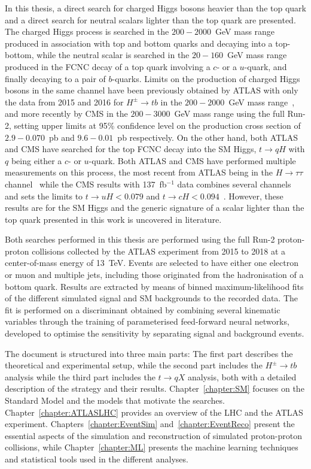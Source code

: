 In this thesis, a direct search for charged Higgs bosons heavier than the top quark and a direct search for neutral scalars lighter than the top quark are presented. The charged Higgs process is searched in the $200-2000$~GeV mass range produced in association with top and bottom quarks and decaying into a top-bottom, while the neutral scalar is searched in the $20-160$~GeV mass range produced in the FCNC decay of a top quark involving a $c$- or a $u$-quark, and finally decaying to a pair of $b$-quarks. Limits on the production of charged Higgs bosons in the same channel have been previously obtained by ATLAS with only the data from 2015 and 2016 for $H^\pm\to tb$ in the $200-2000$~GeV mass range~\cite{ATLASHptb2018}, and more recently by CMS in the $200-3000$~GeV mass range using the full Run-2, setting upper limits at 95\% confidence level on the production cross section of $2.9-0.070$~pb and $9.6-0.01$~pb respectively. On the other hand, both ATLAS and CMS have searched for the top FCNC decay into the SM Higgs, $t\to qH$ with $q$ being either a $c$- or $u$-quark. Both ATLAS and CMS have performed multiple measurements on this process, the most recent from ATLAS being in the $H\to\tau\tau$ channel~\cite{ATLAStqHtautau} while the CMS results with 137~fb$^{-1}$ data combines several channels and sets the limits to $t\to uH < 0.079$ and $t\to cH < 0.094$~\cite{CMStqHRun2}. However, these results are for the SM Higgs and the generic signature of a scalar lighter than the top quark presented in this work is uncovered in literature.

Both searches performed in this thesis are performed using the full Run-2 proton-proton collisions collected by the ATLAS experiment from 2015 to 2018 at a center-of-mass energy of 13~TeV. Events are selected to have either one electron or muon and multiple jets, including those originated from the hadronisation of a bottom quark. Results are extracted by means of binned maximum-likelihood fits of the different simulated signal and SM backgrounds to the recorded data. The fit is performed on a discriminant obtained by combining several kinematic variables through the training of parameterised feed-forward neural networks, developed to optimise the sensitivity by separating signal and background events.

The document is structured into three main parts: The first part describes the theoretical and experimental setup, while the second part includes the $H^\pm\to tb$ analysis while the third part includes the $t\to qX$ analysis, both with a detailed description of the strategy and their results. Chapter~\ref{chapter:SM} focuses on the Standard Model and the models that motivate the searches. Chapter~\ref{chapter:ATLASLHC} provides an overview of the LHC and the ATLAS experiment. Chapters~\ref{chapter:EventSim} and~\ref{chapter:EventReco} present the essential aspects of the simulation and reconstruction of simulated proton-proton collisions, while Chapter~\ref{chapter:ML} presents the machine learning techniques and statistical tools used in the different analyses. 